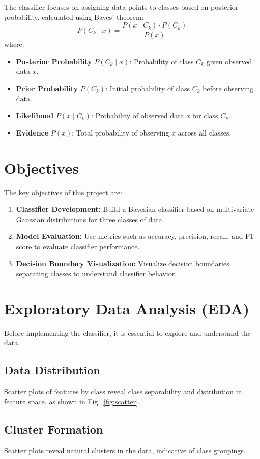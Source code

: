 \documentclass[conference]{IEEEtran}
\begin{document}
	The classifier focuses on assigning data points to classes based on posterior probability, calculated using Bayes' theorem:
	\[
	P(C_k \mid x) = \frac{P(x \mid C_k) \cdot P(C_k)}{P(x)}
	\]
	where:
	\begin{itemize}
		\item \textbf{Posterior Probability} \( P(C_k \mid x) \): Probability of class \( C_k \) given observed data \( x \).
		\item \textbf{Prior Probability} \( P(C_k) \): Initial probability of class \( C_k \) before observing data.
		\item \textbf{Likelihood} \( P(x \mid C_k) \): Probability of observed data \( x \) for class \( C_k \).
		\item \textbf{Evidence} \( P(x) \): Total probability of observing \( x \) across all classes.
	\end{itemize}
	
	\section{Objectives}
	The key objectives of this project are:
	\begin{enumerate}
		\item \textbf{Classifier Development:} Build a Bayesian classifier based on multivariate Gaussian distributions for three classes of data.
		\item \textbf{Model Evaluation:} Use metrics such as accuracy, precision, recall, and F1-score to evaluate classifier performance.
		\item \textbf{Decision Boundary Visualization:} Visualize decision boundaries separating classes to understand classifier behavior.
	\end{enumerate}
	
	\section{Exploratory Data Analysis (EDA)}
	Before implementing the classifier, it is essential to explore and understand the data.
	
	\subsection{Data Distribution}
	Scatter plots of features by class reveal class separability and distribution in feature space, as shown in Fig.~\ref{fig:scatter}.
	
	\subsection{Cluster Formation}\label{AA}
	Scatter plots reveal natural clusters in the data, indicative of class groupings.
	
\end{document}
